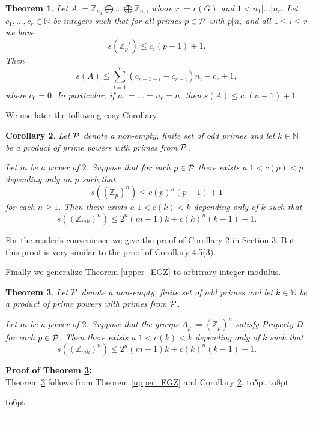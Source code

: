 \documentclass[12pt]{article}
\newtheorem{thm}{Theorem}[section]
\newtheorem{cor}[thm]{Corollary}
\newcommand{\openbox}{\leavevmode
  \hbox to8pt{\hfil\vrule\vbox to6pt{\hrule width6pt\vfil\hrule}\vrule}}
\newcommand{\qed}{\hbox to5pt{ } \hfill \openbox\bigskip\medskip}
\newcommand{\Zp}{\mathbb Z _p}
\newcommand{\cP}{\mbox{$\cal P$}}
\newcommand{\N}{\mathbb N}
\newcommand{\Z}{\mathbb Z}
\begin{document}
\begin{thm} \label{EGZupper}
Let $A:={\Z}_{n_1}\bigoplus \ldots \bigoplus {\Z}_{n_r}$, where $r:=r(G)$ and $1<n_1|\ldots | n_r$. Let $c_1, \ldots ,c_r\in \N$ be integers such that for all primes $p\in \cP$ with $p| n_r$ and all $1\leq i\leq r$ we have 
$$
s({\Zp}^i)\leq c_i(p-1)+1.
$$
Then
$$
s(A)\leq \sum_{i=1}^r (c_{r+1-i}-c_{r-i})n_i -c_r +1,
$$
where $c_0=0$. In particular, if $n_1=\ldots =n_r=n$, then $s(A)\leq c_r(n-1)+1$.
\end{thm}

We use later the following easy Corollary.

\begin{cor} \label{maincor3}
Let $\cP$ denote a non-empty, finite set of odd primes and let $k\in \N$ be a product of prime powers with primes from $\cP$.

Let $m$ be a power of $2$. Suppose that for each $p\in \cP$ there exists a $1<c(p)<p$ depending only on $p$ such that
$$
s(({\Zp})^n)\leq c(p)^n(p-1)+1
$$
for each $n\geq 1$. Then there exists a $1<c(k)<k$ depending only of $k$ such that
$$
s(({\Z}_{mk})^n)\leq 2^n(m-1)k +c(k)^n (k-1) +1.
$$
\end{cor}

For the reader's convenience we give the proof of Corollary \ref{maincor3} in Section 3. But this proof is very similar to the proof of \cite{EEGKR} Corollary 4.5(3). 

Finally we  generalize Theorem \ref{upper_EGZ} to arbitrary integer modulus.



\begin{thm} \label{genEGZ} 
Let $\cP$ denote a non-empty, finite set of odd primes and let $k\in \N$ be a product of prime powers with primes from $\cP$.

Let $m$ be a power of $2$. Suppose that the groups $A_p:=({\Zp})^n$ satisfy Property D for each $p\in \cP$.
Then there exists a $1<c(k)<k$ depending only of $k$ such that
$$
s(({\Z}_{mk})^n)\leq 2^n(m-1)k +c(k)^n (k-1) +1.
$$
\end{thm}

{\bf Proof of Theorem \ref{genEGZ}:}\\

Theorem \ref{genEGZ} follows from Theorem \ref{upper_EGZ} and Corollary \ref{maincor3}. \qed


\end{document}
